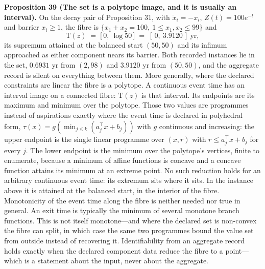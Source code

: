 \documentclass[11pt]{article}
\begin{document}
\textbf{Proposition 39 (The set is a polytope image, and it is usually an interval).} On the decay pair of Proposition 31, with \(\dot x_i = -x_i\), \(Z(t) = 100 e^{-t}\) and barrier \(x_i \ge 1\), the fibre is \(\{x_1 + x_2 = 100,\ 1 \le x_1, x_2 \le 99\}\) and \[
\mathrm T(z) \;=\; \bigl[\,0,\ \log 50\,\bigr] \;=\; [\,0,\ 3.9120\,] \ \text{yr},
\] its supremum attained at the balanced start \((50, 50)\) and its infimum approached as either component nears its barrier. Both recorded instances lie in the set, \(0.6931\) yr from \((2, 98)\) and \(3.9120\) yr from \((50, 50)\), and the aggregate record is silent on everything between them. More generally, where the declared constraints are linear the fibre is a polytope. A continuous event time has an interval image on a connected fibre: \(\mathrm T(z)\) is that interval. Its endpoints are its maximum and minimum over the polytope. Those two values are programmes instead of aspirations exactly where the event time is declared in polyhedral form, \(\tau(x) = g(\min_{j \le k}(a_j^{\top} x + b_j))\) with \(g\) continuous and increasing: the upper endpoint is the single linear programme over \((x, r)\) with \(r \le a_j^{\top} x + b_j\) for every \(j\). The lower endpoint is the minimum over the polytope's vertices, finite to enumerate, because a minimum of affine functions is concave and a concave function attains its minimum at an extreme point. No such reduction holds for an arbitrary continuous event time: its extremum sits where it sits. In the instance above it is attained at the balanced start, in the interior of the fibre. Monotonicity of the event time along the fibre is neither needed nor true in general. An exit time is typically the minimum of several monotone branch functions. This is not itself monotone---and where the declared set is non-convex the fibre can split, in which case the same two programmes bound the value set from outside instead of recovering it. Identifiability from an aggregate record holds exactly when the declared component data reduce the fibre to a point---which is a statement about the input, never about the aggregate.
\end{document}
